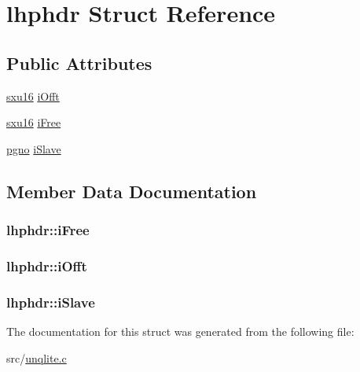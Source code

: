 \hypertarget{structlhphdr}{\section{lhphdr Struct Reference}
\label{d5/d4d/structlhphdr}
}
\subsection*{Public Attributes}
\begin{DoxyCompactItemize}
\item 
\hyperlink{unqlite_8c_a0fea45724d256332e7ae0104f83260a7}{sxu16} \hyperlink{structlhphdr_ad866c26a5f945f8abfbcb629a2db9a3d}{i\-Offt}
\item 
\hyperlink{unqlite_8c_a0fea45724d256332e7ae0104f83260a7}{sxu16} \hyperlink{structlhphdr_a3592f1d9fb2746b0b9707f7449ac46da}{i\-Free}
\item 
\hyperlink{unqlite_8c_a90bf132c9229151f7c29e84e592907cd}{pgno} \hyperlink{structlhphdr_a7c2205c94ae3ab7e384dc6f12af1df68}{i\-Slave}
\end{DoxyCompactItemize}


\subsection{Member Data Documentation}
\hypertarget{structlhphdr_a3592f1d9fb2746b0b9707f7449ac46da}{
\subsubsection[{i\-Free}]{ lhphdr\-::i\-Free}}\label{d5/d4d/structlhphdr_a3592f1d9fb2746b0b9707f7449ac46da}
\hypertarget{structlhphdr_ad866c26a5f945f8abfbcb629a2db9a3d}{
\subsubsection[{i\-Offt}]{ lhphdr\-::i\-Offt}}\label{d5/d4d/structlhphdr_ad866c26a5f945f8abfbcb629a2db9a3d}
\hypertarget{structlhphdr_a7c2205c94ae3ab7e384dc6f12af1df68}{
\subsubsection[{i\-Slave}]{ lhphdr\-::i\-Slave}}\label{d5/d4d/structlhphdr_a7c2205c94ae3ab7e384dc6f12af1df68}


The documentation for this struct was generated from the following file\-:\begin{DoxyCompactItemize}
\item 
src/\hyperlink{unqlite_8c}{unqlite.\-c}\end{DoxyCompactItemize}
